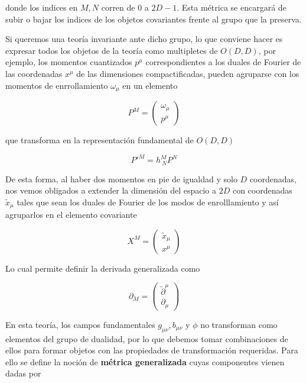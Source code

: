 \documentclass{article}
\numberwithin{equation}{section}
\begin{document}
donde los indices en $ M,N $ corren de $ 0 $ a $ 2D-1 $. Esta métrica se encargará de subir o bajar los indices de los objetos covariantes frente al grupo que la preserva.

Si queremos una teoría invariante ante dicho grupo, lo que conviene hacer es expresar todos los objetos de la teoría como multipletes de $ O(D,D) $, por ejemplo, los momentos cuantizados $ p^{\mu} $ correspondientes a los duales de Fourier de las coordenadas $ x^{\mu} $ de las dimensiones compactificadas, pueden agruparse con los momentos de enrrollamiento $ \omega_{\mu} $ en un elemento

\begin{equation}\label{key}
P^M= \begin{pmatrix}
\omega_{\mu} \\
p^{\mu}
\end{pmatrix}
\end{equation}

que transforma en la representación fundamental de $ O(D,D) $

\begin{equation}\label{key}
P'^M=h_{\ N}^M P^N
\end{equation}

De esta forma, al haber dos momentos en pie de igualdad y solo $ D $ coordenadas, nos vemos obligados a extender la dimensión del espacio a $ 2D $ con coordenadas $ \widetilde{x}_{\mu} $ tales que sean los duales de Fourier de los modos de enrolllamiento y así agruparlos en el elemento covariante

\begin{equation}\label{key}
X^M= \begin{pmatrix}
\widetilde{x}_{\mu}\\
x^{\mu}
\end{pmatrix}
\end{equation}

Lo cual permite definir la derivada generalizada como

\begin{equation}\label{key}
\partial_M= 
\begin{pmatrix}
\widetilde{\partial}^{\mu} \\
\partial_ {\mu}
\end{pmatrix}
\end{equation}

En esta teoría, los campos fundamentales $ g_{\mu\nu},b_{\mu\nu} $ y $ \phi $ no transforman como elementos del grupo de dualidad, por lo que debemos tomar combinaciones de ellos para formar objetos con las propiedades de transformación requeridas. Para ello se define la noción de \textbf{métrica generalizada} cuyas componentes vienen dadas por
\end{document}
